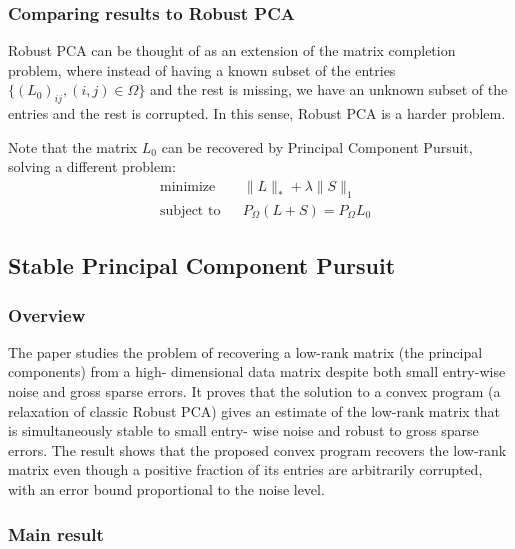 \documentclass{../common/projectreport}
\begin{document}
\subsubsection{Comparing results to Robust PCA}
Robust PCA can be thought of as an extension of the matrix completion problem, where instead of having a known subset of the entries $\{(L_0)_{ij}, (i,j)\in \Omega\}$ and the rest is missing, we have an unknown subset of the entries and the rest is corrupted. In this sense, Robust PCA is a harder problem.

Note that the matrix $L_0$ can be recovered by Principal Component Pursuit, solving a different problem:
\begin{equation}
\begin{aligned}
&\text{minimize} && \|L\|_* + \lambda \|S\|_1\\
&\text{subject to} && P_\Omega (L+S) = P_\Omega L_0
\end{aligned}
\end{equation}





\subsection{Stable Principal Component Pursuit}
\subsubsection{Overview}

The paper studies the problem of recovering a low-rank matrix (the principal components) from a high- dimensional data matrix despite both small entry-wise noise and gross sparse errors. It proves that the solution to a convex program (a relaxation of classic Robust PCA) gives an estimate of the low-rank matrix that is simultaneously stable to small entry- wise noise and robust to gross sparse errors. The result shows that the proposed convex program recovers the low-rank matrix even though a positive fraction of its entries are arbitrarily corrupted, with an error bound proportional to the noise level. 

\subsubsection{Main result}
\end{document}
